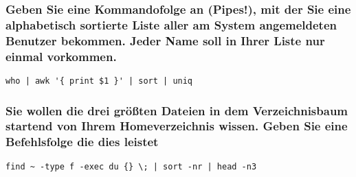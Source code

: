 \subsubsection*{Geben Sie eine Kommandofolge an (Pipes!), mit der Sie eine
alphabetisch sortierte Liste aller am System angemeldeten Benutzer bekommen.
Jeder Name soll in Ihrer Liste nur einmal vorkommen.}
\begin{lstlisting}
who | awk '{ print $1 }' | sort | uniq
\end{lstlisting}

\subsubsection*{Sie wollen die drei größten Dateien in dem Verzeichnisbaum
startend von Ihrem Homeverzeichnis wissen. Geben Sie eine Befehlsfolge die dies
leistet}
\begin{lstlisting}
find ~ -type f -exec du {} \; | sort -nr | head -n3
\end{lstlisting}


